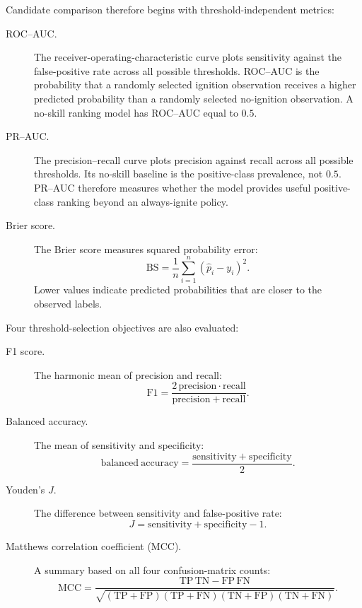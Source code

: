 Candidate comparison therefore begins with threshold-independent metrics:

\begin{description}
  \item[ROC--AUC.]
  The receiver-operating-characteristic curve plots sensitivity against the
  false-positive rate across all possible thresholds. ROC--AUC is the
  probability that a randomly selected ignition observation receives a higher
  predicted probability than a randomly selected no-ignition observation. A
  no-skill ranking model has ROC--AUC equal to \(0.5\).

  \item[PR--AUC.]
  The precision--recall curve plots precision against recall across all
  possible thresholds. Its no-skill baseline is the positive-class prevalence,
  not \(0.5\). PR--AUC therefore measures whether the model provides useful
  positive-class ranking beyond an always-ignite policy.

  \item[Brier score.]
  The Brier score measures squared probability error:
  \[
  \mathrm{BS}
  =\frac{1}{n}\sum_{i=1}^{n}
  \left(\widehat p_i-y_i\right)^2.
  \]
  Lower values indicate predicted probabilities that are closer to the
  observed labels.
\end{description}

Four threshold-selection objectives are also evaluated:

\begin{description}
  \item[F1 score.]
  The harmonic mean of precision and recall:
  \[
  \mathrm{F1}
  =\frac{2\,\mathrm{precision}\cdot\mathrm{recall}}
  {\mathrm{precision}+\mathrm{recall}}.
  \]

  \item[Balanced accuracy.]
  The mean of sensitivity and specificity:
  \[
  \mathrm{balanced\ accuracy}
  =\frac{\mathrm{sensitivity}+\mathrm{specificity}}{2}.
  \]

  \item[Youden's \(J\).]
  The difference between sensitivity and false-positive rate:
  \[
  J=\mathrm{sensitivity}+\mathrm{specificity}-1.
  \]

  \item[Matthews correlation coefficient (MCC).]
  A summary based on all four confusion-matrix counts:
  \[
  \mathrm{MCC}
  =\frac{\mathrm{TP}\,\mathrm{TN}-\mathrm{FP}\,\mathrm{FN}}
  {\sqrt{(\mathrm{TP}+\mathrm{FP})(\mathrm{TP}+\mathrm{FN})
  (\mathrm{TN}+\mathrm{FP})(\mathrm{TN}+\mathrm{FN})}}.
  \]
\end{description}

